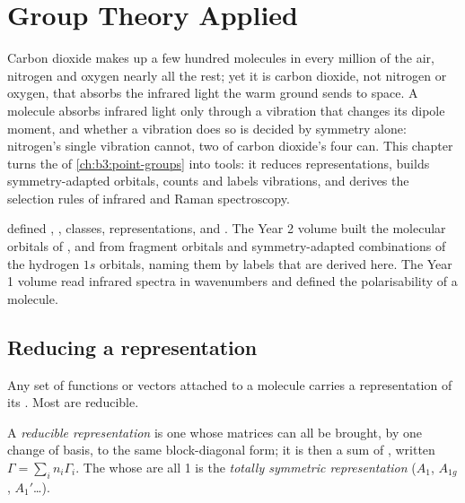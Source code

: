 \chapter{Group Theory Applied}\label{ch:b3:group-theory-applied}

Carbon dioxide makes up a few hundred molecules in every million of the
air, nitrogen and oxygen nearly all the rest; yet it is carbon dioxide, not
nitrogen or oxygen, that absorbs the infrared light the warm ground sends to
space. A molecule absorbs infrared light only through a vibration that
changes its dipole moment, and whether a vibration does so is decided by
symmetry alone: nitrogen's single vibration cannot, two of carbon dioxide's
four can. This chapter turns the  of
\cref{ch:b3:point-groups} into tools: it reduces representations, builds
symmetry-adapted orbitals, counts and labels vibrations, and derives the
selection rules of infrared and Raman spectroscopy.

\begin{recall}
 defined , ,
classes, representations,  and . The Year 2
volume built the molecular orbitals of ,  and  from
fragment orbitals and symmetry-adapted combinations of the hydrogen $1s$
orbitals, naming them by labels that are derived here. The Year 1 volume
read infrared spectra in wavenumbers and defined the polarisability of a
molecule.
\end{recall}

\section{Reducing a representation}

Any set of functions or vectors attached to a molecule carries a
representation of its . Most are reducible.

\begin{definition}\label{def:b3:group-theory-applied:reducible}
A \emph{reducible representation} is one
whose matrices can all be brought, by one change of basis, to the same
block-diagonal form; it is then a sum of ,
written $\Gamma = \sum_in_i\Gamma_i$. The  whose
 are all 1 is the \emph{totally symmetric
representation} ($A_1$, $A_{1g}$,
$A_1'$\dots).
\end{definition}

